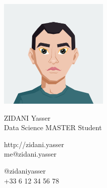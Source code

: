 \documentclass{article}
\begin{document}
\centering \includegraphics[width=.25\linewidth]{AvatarMaker}\\[3pt]
\parbox{2in}{\Large \centering ZIDANI Yasser\\[1pt]
\normalsize Data Science MASTER Student}

\vfill
\raggedright
\begin{multicols}{2}
http://zidani.yasser\\
me@zidani.yasser

\columnbreak
\raggedleft
@zidaniyasser\\
+33 6 12 34 56 78%
\end{multicols}%
\end{document}
